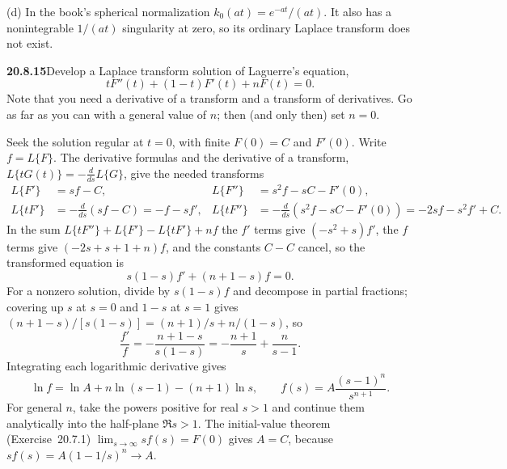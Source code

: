 (d) In the book's spherical normalization
$k_0(at)=e^{-at}/(at)$. It also has a nonintegrable $1/(at)$
singularity at zero, so its ordinary Laplace transform does
not exist.

\par\bigskip
\noindent\textbf{20.8.15}\quad Develop a Laplace transform
solution of Laguerre's equation,
\[
tF''(t)+(1-t)F'(t)+nF(t)=0.
\]
Note that you need a derivative of a transform and a transform of
derivatives. Go as far as you can with a general value of $n$;
then (and only then) set $n=0$.
\par{}
\solution
Seek the solution regular at $t=0$, with finite
$F(0)=C$ and $F'(0)$. Write $f=L\{F\}$. The derivative
formulas and the derivative of a transform,
$L\{tG(t)\}=-\frac d{ds}L\{G\}$, give the needed transforms
\begin{align*}
L\{F'\}&=sf-C, &L\{F''\}&=s^2f-sC-F'(0),\\
L\{tF'\}&=-\frac d{ds}(sf-C)=-f-sf',
&L\{tF''\}&=-\frac d{ds}(s^2f-sC-F'(0))=-2sf-s^2f'+C.
\end{align*}
In the sum $L\{tF''\}+L\{F'\}-L\{tF'\}+nf$ the $f'$ terms give
$(-s^2+s)f'$, the $f$ terms give $(-2s+s+1+n)f$, and the
constants $C-C$ cancel, so the transformed equation is
\[
s(1-s)f'+(n+1-s)f=0.
\]
For a nonzero solution, divide by $s(1-s)f$ and decompose in
partial fractions; covering up $s$ at $s=0$ and $1-s$ at $s=1$
gives $(n+1-s)/[s(1-s)]=(n+1)/s+n/(1-s)$, so
\[
\frac{f'}f=-\frac{n+1-s}{s(1-s)}
=-\frac{n+1}{s}+\frac n{s-1}.
\]
Integrating each logarithmic derivative gives
\[
\ln f=\ln A+n\ln(s-1)-(n+1)\ln s,
\qquad f(s)=A\frac{(s-1)^n}{s^{n+1}}.
\]
For general $n$, take the powers positive for real $s>1$ and
continue them analytically into the half-plane $\Re s>1$.
The initial-value theorem (Exercise~20.7.1)
$\lim_{s\to\infty}sf(s)=F(0)$ gives $A=C$, because
$sf(s)=A(1-1/s)^n\to A$.
